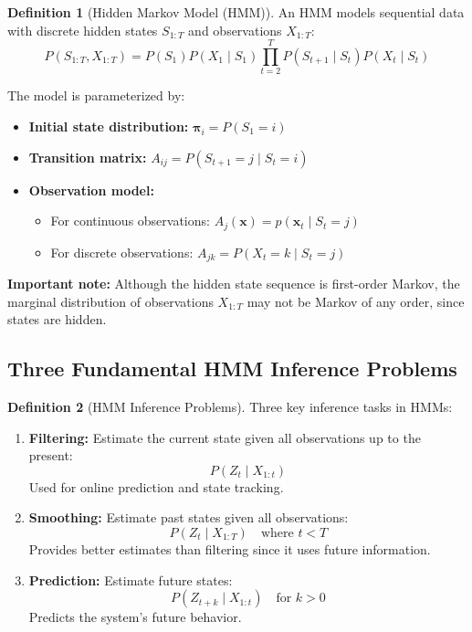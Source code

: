 \documentclass[12pt,a4paper]{article}
\theoremstyle{definition}
\newtheorem{definition}{Definition}[section]
\begin{document}
\begin{definition}[Hidden Markov Model (HMM)]
An HMM models sequential data with discrete hidden states $S_{1:T}$ and observations $X_{1:T}$:
\[
P(S_{1:T}, X_{1:T}) = P(S_1) P(X_1 \mid S_1) \prod_{t=2}^T P(S_{t+1} \mid S_t) P(X_t \mid S_t)
\]

The model is parameterized by:
\begin{itemize}
    \item \textbf{Initial state distribution:} $\boldsymbol{\pi}_i = P(S_1 = i)$
    
    \item \textbf{Transition matrix:} $A_{ij} = P(S_{t+1} = j \mid S_t = i)$
    
    \item \textbf{Observation model:}
    \begin{itemize}
        \item For continuous observations: $A_j(\mathbf{x}) = p(\mathbf{x}_t \mid S_t = j)$
        \item For discrete observations: $A_{jk} = P(X_t = k \mid S_t = j)$
    \end{itemize}
\end{itemize}

\textbf{Important note:} Although the hidden state sequence is first-order Markov, the marginal distribution of observations $X_{1:T}$ may not be Markov of any order, since states are hidden.
\end{definition}

\subsection{Three Fundamental HMM Inference Problems}

\begin{definition}[HMM Inference Problems]
Three key inference tasks in HMMs:

\begin{enumerate}
    \item \textbf{Filtering:} Estimate the current state given all observations up to the present:
    \[
    P(Z_t \mid X_{1:t})
    \]
    Used for online prediction and state tracking.
    
    \item \textbf{Smoothing:} Estimate past states given all observations:
    \[
    P(Z_t \mid X_{1:T}) \quad \text{where } t < T
    \]
    Provides better estimates than filtering since it uses future information.
    
    \item \textbf{Prediction:} Estimate future states:
    \[
    P(Z_{t+k} \mid X_{1:t}) \quad \text{for } k > 0
    \]
    Predicts the system's future behavior.
\end{enumerate}
\end{definition}
\end{document}
